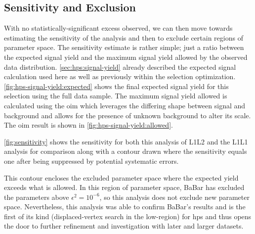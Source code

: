 \subsection{Sensitivity and Exclusion}
With no statistically-significant excess observed, we can then move towards estimating the sensitivity of
the analysis and then to exclude certain regions of parameter space.
The sensitivity estimate is rather simple; just a ratio between the expected signal yield
and the maximum signal yield allowed by the observed data distribution.
\cref{sec:hps:signal-yield} already described the expected signal calculation used here
as well as previously within the selection optimization.
\cref{fig:hps-signal-yield:expected} shows the final expected signal yield for this selection
using the full data sample.
The maximum signal yield allowed is calculated using the \ac{oim} \cite{yellin-oim:2002}
which leverages the differing shape between signal and background and allows for the presence
of unknown background to alter its scale.
The \ac{oim} result is shown in \cref{fig:hps-signal-yield:allowed}.

\cref{fig:sensitivity} shows the sensitivity for both this analysis of L1L2 and the L1L1 analysis
for comparison along with a contour drawn where the sensitivity equals one after being suppressed
by potential systematic errors.

This contour encloses the excluded parameter space where the expected yield exceeds what is allowed.
In this region of parameter space, BaBar\cite{babar-2017} has excluded the parameters above
$\epsilon^2 = 10^{-6}$, so this analysis does not exclude new parameter space.
Nevertheless, this analysis was able to confirm BaBar's results and is the first of its kind
(displaced-vertex search in the low-\Psum region) for \ac{hps} and thus
opens the door to further refinement and investigation with later and larger datasets.

